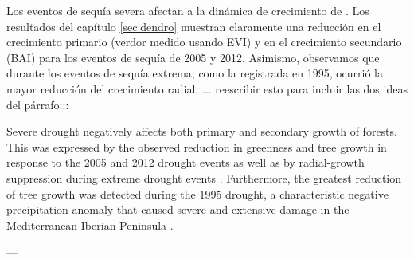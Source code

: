 Los eventos de sequía severa afectan a la dinámica de crecimiento de \Qp. Los resultados del capítulo \ref{sec:dendro} muestran claramente una reducción en el crecimiento primario (verdor medido usando EVI) y en el crecimiento secundario (BAI) para los eventos de sequía de 2005 y 2012. Asimismo, observamos que durante los eventos de sequía extrema, como la registrada en 1995, ocurrió la mayor reducción del crecimiento radial. ... reescribir esto para incluir las dos ideas del párrafo:::  

Severe drought negatively affects both primary and secondary growth of \Qp forests. This was expressed by the observed reduction in greenness and tree growth in response to the 2005 and 2012 drought events as well as by radial-growth suppression during extreme drought events \autocite{Corcueraetal2006RadialgrowthWoodanatomical,GeaIzquierdoCanellas2014LocalClimate}. Furthermore, the greatest reduction of tree growth was detected during the 1995 drought, a characteristic negative precipitation anomaly that caused severe and extensive damage in the Mediterranean Iberian Peninsula \autocite{Penuelasetal2001SevereDrought,Gazoletal2018ForestResilience}.

--- 
